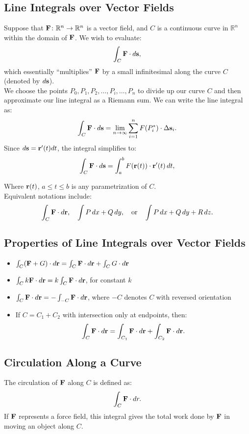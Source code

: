 \subsection{Line Integrals over Vector Fields}
Suppose that \( \mathbf{F} \colon \mathbb{R}^n \to \mathbb{R}^n \) is a vector field, and \( C \) is a continuous curve in \( \mathbb{R}^n \) within the domain of \( \mathbf{F} \). We wish to evaluate:
\[ \int_C \mathbf{F} \cdot d\mathbf{s}, \]
which essentially ``multiplies'' \(\mathbf{F}\) by a small infinitesimal along the curve \(C\) (denoted by \(d\mathbf{s}\)). \\

We choose the points \(P_{0}, P_{1}, P_{2}, \ldots, P_{i},\ldots, P_{n}\) to divide up our curve \(C\) and then approximate our line integral as a Riemann sum. We can write the line integral as:
\[ \int_C \mathbf{F} \cdot d\mathbf{s} = \lim_{n\to\infty} \sum_{i=1}^{n} F(P^*_i) \cdot \Delta \mathbf{s}_i. \]
Since \( d\mathbf{s} = \mathbf{r}'(t) dt \), the integral simplifies to:
\[ \int_C \mathbf{F} \cdot d\mathbf{s} = \int_a^b F(\mathbf{r}(t)) \cdot \mathbf{r}'(t) \, dt, \]

Where \( \mathbf{r}(t) \), \(a \leq t \leq b\) is any parametrization of \(C\). \\ 

Equivalent notations include:
\[ \int_C \mathbf{F} \cdot d\mathbf{r}, \quad \int P \, dx + Q \, dy, \quad \text{or} \quad \int P \, dx + Q \, dy + R \, dz. \]

\subsection{Properties of Line Integrals over Vector Fields}
\begin{itemize}
    \item \( \int_C (\mathbf{F} + G) \cdot d\mathbf{r} = \int_C \mathbf{F} \cdot d\mathbf{r} + \int_C G \cdot d\mathbf{r} \)
    \item \( \int_C k\mathbf{F} \cdot d\mathbf{r} = k \int_C \mathbf{F} \cdot d\mathbf{r} \), for constant \( k \)
    \item \( \int_C \mathbf{F} \cdot d\mathbf{r} = - \int_{-C} \mathbf{F} \cdot d\mathbf{r} \), where \( -C \) denotes \( C \) with reversed orientation
    \item If \( C = C_1 + C_2 \) with intersection only at endpoints, then:
    \[ \int_C \mathbf{F} \cdot d\mathbf{r} = \int_{C_1} \mathbf{F} \cdot d\mathbf{r} + \int_{C_2} \mathbf{F} \cdot d\mathbf{r}. \]
\end{itemize}

\subsection{Circulation Along a Curve}
The circulation of \( \mathbf{F} \) along \( C \) is defined as:
\[ \int_C \mathbf{F} \cdot dr. \]
If \( \mathbf{F} \) represents a force field, this integral gives the total work done by \( \mathbf{F} \) in moving an object along \( C \).

